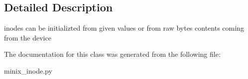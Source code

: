 \subsection{Detailed Description}
\begin{DoxyVerb}inodes can be initializted from given values or from raw bytes contents coming from the device \end{DoxyVerb}
 

The documentation for this class was generated from the following file\+:\begin{DoxyCompactItemize}
\item 
minix\+\_\+inode.\+py\end{DoxyCompactItemize}
